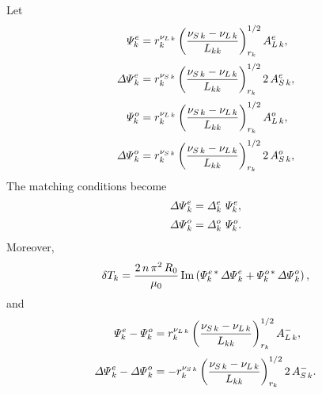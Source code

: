 \documentclass[12pt,prb,aps,notitlepage]{revtex4-1}
\begin{document}
Let
\begin{align}
{\mit\Psi}_k^e &= r_k^{\nu_{L\,k}}\left(\frac{\nu_{S\,k}-\nu_{L\,k}}{L_{kk}}\right)^{1/2}_{r_k} A_{L\,k}^e,\\[0.5ex]
{\mit\Delta\Psi}_k^e &= r_k^{\nu_{S\,k}}\left(\frac{\nu_{S\,k}-\nu_{L\,k}}{L_{kk}}\right)^{1/2}_{r_k} 2\,A_{S\,k}^e,\\[0.5ex]
{\mit\Psi}_k^o &= r_k^{\nu_{L\,k}}\left(\frac{\nu_{S\,k}-\nu_{L\,k}}{L_{kk}}\right)^{1/2}_{r_k} A_{L\,k}^o,\\[0.5ex]
{\mit\Delta\Psi}_k^o&= r_k^{\nu_{S\,k}}\left(\frac{\nu_{S\,k}-\nu_{L\,k}}{L_{kk}}\right)^{1/2}_{r_k} 2\,A_{S\,k}^o,
\end{align}
The matching conditions become
\begin{align}\label{e132}
{\mit\Delta\Psi}_k^e &= {\mit\Delta}_k^e\,\,{\mit\Psi}_k^e,\\[0.5ex]
{\mit\Delta\Psi}_k^o &= {\mit\Delta}_k^o\,\,{\mit\Psi}_k^o.
\end{align}
Moreover,
\begin{equation}
\delta T_k = \frac{2\,n\,\pi^2\,R_0}{\mu_0}\,{\rm Im}\left(
{\mit\Psi}_k^{e\,\ast} \,{\mit\Delta\Psi}_k^{e}
+{\mit\Psi}_k^{o\,\ast} \,{\mit\Delta\Psi}_k^{o}\right),\label{e152}
\end{equation}
and
\begin{align}
{\mit\Psi}_k^e - {\mit\Psi}_k^o &= r_k^{\nu_{L\,k}}\left(\frac{\nu_{S\,k}-\nu_{L\,k}}{L_{kk}}\right)^{1/2}_{r_k} A_{L\,k}^-,\\[0.5ex]
{\mit\Delta\Psi}_k^e - {\mit\Delta\Psi}_k^o &= -r_k^{\nu_{S\,k}}\left(\frac{\nu_{S\,k}-\nu_{L\,k}}{L_{kk}}\right)^{1/2}_{r_k} 2\,A_{S\,k}^-.
\end{align}
\end{document}
